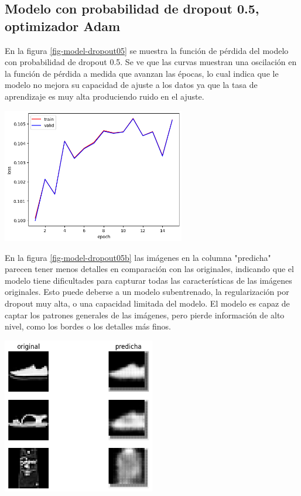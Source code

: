 \documentclass[aps,prl,reprint,groupedaddress]{revtex4-2}
\newenvironment{Figura}
  {\par\medskip\noindent\minipage{\linewidth}}
  {\endminipage\par\medskip}
\begin{document}
\subsection{Modelo con probabilidad de dropout 0.5, optimizador Adam}

En la figura \ref{fig-model-dropout05} se muestra la función de pérdida del
modelo con probabilidad de dropout 0.5. Se ve que las curvas muestran una 
oscilación en la función de pérdida a medida que avanzan las épocas, lo cual
indica que le modelo no mejora su capacidad de ajuste a los datos ya que la 
tasa de aprendizaje es muy alta produciendo ruido en el ajuste.

\begin{Figura}
  \centering
  \includegraphics[width=0.60\textwidth]{figs/modelo_dropout05.png}
  \label{fig-model-dropout05}
\end{Figura}

En la figura \ref{fig-model-dropout05b} las imágenes en la columna "predicha" 
parecen tener menos detalles en comparación con las originales, indicando que 
el modelo tiene dificultades para capturar todas las características de las 
imágenes originales. Esto puede deberse a un modelo subentrenado, la 
regularización por dropout muy alta, o una capacidad limitada del modelo. 
El modelo es capaz de captar los patrones generales de las imágenes, 
pero pierde información de alto nivel, como los bordes o los detalles más finos.

\begin{Figura}
  \centering
  \includegraphics[width=0.5\textwidth]{figs/test_modelo_dropout05.png}
  \label{fig-model-dropout05b}
\end{Figura}
\end{document}
